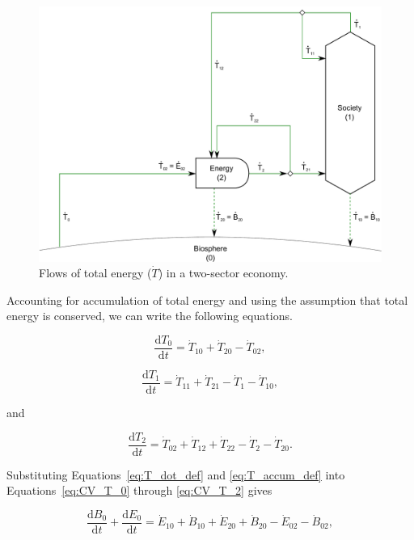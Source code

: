 \begin{figure}[h!]
\includegraphics[width=0.9\linewidth]{Part_2/Chapter_Embodied/images/2_sector_embodied_energy.pdf}
\caption{Flows of total energy ($\dot{T}$) in a two-sector economy.}
\label{fig:B_total_energy}
\end{figure}

Accounting for accumulation of total energy and using the assumption 
that total energy is conserved, we can write the following equations.

\begin{equation} \label{eq:CV_T_0}
	\frac{\mathrm{d}T_{0}}{\mathrm{d}t} 	 
	= \dot{T}_{10} 
	+ \dot{T}_{20} 
	- \dot{T}_{02},
\end{equation}

\begin{equation} \label{eq:CV_T_1}
	\frac{\mathrm{d}T_{1}}{\mathrm{d}t} 	 
	= \dot{T}_{11}
	+ \dot{T}_{21} 
	- \dot{T}_{1}
	- \dot{T}_{10},
\end{equation}

\noindent and

\begin{equation} \label{eq:CV_T_2}
	\frac{\mathrm{d}T_{2}}{\mathrm{d}t} 	 
	= \dot{T}_{02} 
	+ \dot{T}_{12}
	+ \dot{T}_{22} 
	- \dot{T}_{2} 
	- \dot{T}_{20}.
\end{equation}

Substituting Equations~\ref{eq:T_dot_def} 
and \ref{eq:T_accum_def} into 
Equations~\ref{eq:CV_T_0} through
\ref{eq:CV_T_2} gives

\begin{equation} \label{eq:CV_dB_0}
	\frac{\mathrm{d}B_{0}}{\mathrm{d}t} 
	+ \frac{\mathrm{d}E_{0}}{\mathrm{d}t} 
	= \dot{E}_{10} 
	+ \dot{B}_{10} 
	+ \dot{E}_{20} 
	+ \dot{B}_{20} 
	- \dot{E}_{02} 
	- \dot{B}_{02},
\end{equation}

